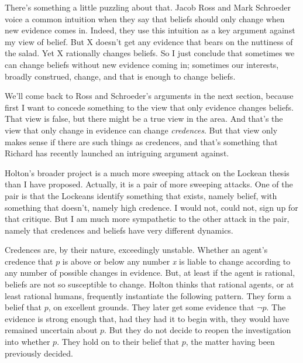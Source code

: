 There's something a little puzzling about that. Jacob Ross and Mark Schroe\-der \citeyearpar{SchroederRoss2012} voice a common intuition when they say that beliefs should only change when new evidence comes in. Indeed, they use this intuition as a key argument against my view of belief. But X doesn't get any evidence that bears on the nuttiness of the salad. Yet X rationally changes beliefs. So I just conclude that sometimes we can change beliefs without new evidence coming in; sometimes our interests, broadly construed, change, and that is enough to change beliefs.

We'll come back to Ross and Schroeder's arguments in the next section, because first I want to concede something to the view that only evidence changes beliefs. That view is false, but there might be a true view in the area. And that's the view that only change in evidence can change \textit{credences}. But that view only makes sense if there are such things as credences, and that's something that Richard \citet{Holton2013} has recently launched an intriguing argument against.

Holton's broader project is a much more sweeping attack on the Lockean thesis than I have proposed. Actually, it is a pair of more sweeping attacks. One of the pair is that the Lockeans identify something that exists, namely belief, with something that doesn't, namely high credence. I would not, could not, sign up for that critique. But I am much more sympathetic to the other attack in the pair, namely that credences and beliefs have very different dynamics.

Credences are, by their nature, exceedingly unstable. Whether an agent's credence that $p$ is above or below any number \textit{x} is liable to change according to any number of possible changes in evidence. But, at least if the agent is rational, beliefs are not so susceptible to change. Holton thinks that rational agents, or at least rational humans, frequently instantiate the following pattern. They form a belief that $p$, on excellent grounds. They later get some evidence that $\neg p$. The evidence is strong enough that, had they had it to begin with, they would have remained uncertain about $p$. But they do not decide to reopen the investigation into whether $p$. They hold on to their belief that $p$, the matter having been previously decided.

